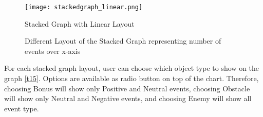 \begin{figure}
\centering
\texttt{[image: stackedgraph\_linear.png]}
\caption{Stacked Graph with Linear Layout}
\label{fig:linear}
\end{figure}

\begin{figure}[htp] %
\centering
{}\hfil
{}

\hfil
{}

\caption{Different Layout of the Stacked Graph representing number of events over x-axis}
\end{figure}

For each stacked graph layout, user can choose which object type to show on the graph \ref{t15}. Options are available as radio button on top of the chart. Therefore, choosing Bonus will show only Positive and Neutral events, choosing Obstacle will show only Neutral and Negative events, and choosing Enemy will show all event type.

